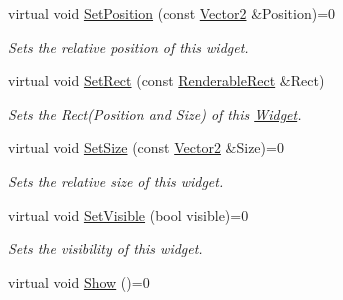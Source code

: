 \begin{DoxyCompactItemize}
virtual void \hyperlink{classphys_1_1UI_1_1Widget_a3ef894be2c0868105b2bf495ae944d00}{SetPosition} (const \hyperlink{classphys_1_1Vector2}{Vector2} \&Position)=0
\begin{DoxyCompactList}\small\item\em Sets the relative position of this widget. \item\end{DoxyCompactList}\item 
virtual void \hyperlink{classphys_1_1UI_1_1Widget_a5ef3d6feab24fd891b17780069e012e5}{SetRect} (const \hyperlink{structphys_1_1UI_1_1RenderableRect}{RenderableRect} \&Rect)
\begin{DoxyCompactList}\small\item\em Sets the Rect(Position and Size) of this \hyperlink{classphys_1_1UI_1_1Widget}{Widget}. \item\end{DoxyCompactList}\item 
virtual void \hyperlink{classphys_1_1UI_1_1Widget_a00f73c12583d25a75c089f944075b24d}{SetSize} (const \hyperlink{classphys_1_1Vector2}{Vector2} \&Size)=0
\begin{DoxyCompactList}\small\item\em Sets the relative size of this widget. \item\end{DoxyCompactList}\item 
virtual void \hyperlink{classphys_1_1UI_1_1Widget_ab049233d8d5522a6ab42654b8924a3e0}{SetVisible} (bool visible)=0
\begin{DoxyCompactList}\small\item\em Sets the visibility of this widget. \item\end{DoxyCompactList}\item 
\hypertarget{classphys_1_1UI_1_1Widget_aa53e64903afc4a1fecd066c814b6c8d4}{
virtual void \hyperlink{classphys_1_1UI_1_1Widget_aa53e64903afc4a1fecd066c814b6c8d4}{Show} ()=0}
\label{classphys_1_1UI_1_1Widget_aa53e64903afc4a1fecd066c814b6c8d4}


\end{DoxyCompactItemize}
